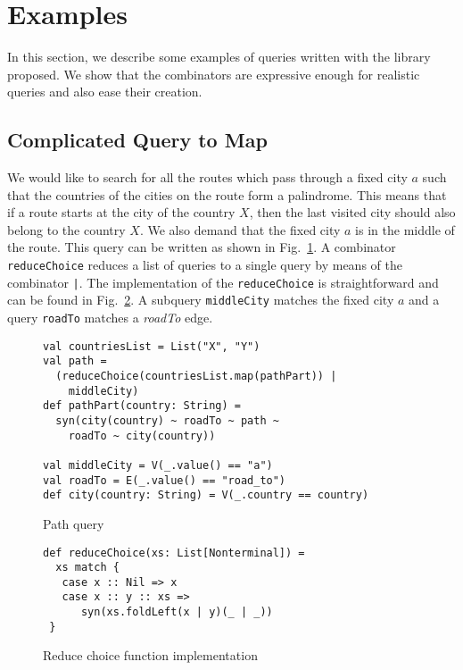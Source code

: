 \section{Examples}
\label{sec:examples}

In this section, we describe some examples of queries written with the library proposed.
We show that the combinators are expressive enough for realistic queries and also ease their creation.

\subsection{Complicated Query to Map}

We would like to search for all the routes which pass through a fixed city $a$ such that the countries of the cities on the route form a palindrome.
This means that if a route starts at the city of the country $X$, then the last visited city should also belong to the country $X$.
We also demand that the fixed city $a$ is in the middle of the route.
This query can be written as shown in Fig.~\ref{fig:pathQuery}.
A combinator \lstinline{reduceChoice} reduces a list of queries to a single query by means of the combinator \lstinline{|}.
The implementation of the \lstinline{reduceChoice} is straightforward and can be found in Fig.~\ref{fig:reduceChoice}.
A subquery \lstinline{middleCity} matches the fixed city $a$ and a query \lstinline{roadTo} matches a \emph{roadTo} edge.

\begin{figure}[h]
\begin{lstlisting}
val countriesList = List("X", "Y")
val path =
  (reduceChoice(countriesList.map(pathPart)) |
    middleCity)
def pathPart(country: String) =
  syn(city(country) ~ roadTo ~ path ~
    roadTo ~ city(country))

val middleCity = V(_.value() == "a")
val roadTo = E(_.value() == "road_to")
def city(country: String) = V(_.country == country)
\end{lstlisting}
\caption{Path query}
\label{fig:pathQuery}
\end{figure}

\begin{figure}[h]
\begin{lstlisting}
def reduceChoice(xs: List[Nonterminal]) =
  xs match {
   case x :: Nil => x
   case x :: y :: xs =>
      syn(xs.foldLeft(x | y)(_ | _))
 }
\end{lstlisting}
\caption{Reduce choice function implementation}
\label{fig:reduceChoice}
\end{figure}

